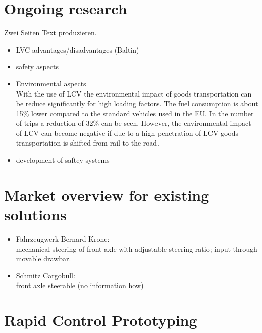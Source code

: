 \documentclass[ExampleMasters.tex]{subfiles}
\begin{document}
\section{Ongoing research}
\label{sec:ongoing_research}
Zwei Seiten Text produzieren. 
\begin{itemize}
	\item LVC advantages/disadvantages (Baltin)
	\item safety aspects
	\item Environmental aspects \\
	With the use of LCV the environmental impact of goods transportation can be reduce significantly for high loading factors. The fuel consumption is about 15\% lower compared to the standard vehicles used in the EU. In the number of trips a reduction of 32\% can be seen. \cite{backman2002improved}
	However, the environmental impact of LCV can become negative if due to a high penetration of LCV goods transportation is shifted from rail to the road. \cite{doll2009long}
	\item development of saftey systems
\end{itemize}

\section{Market overview for existing solutions}
\label{sec:market_overview}
\begin{itemize}
	\item Fahrzeugwerk Bernard Krone: \\
	mechanical steering of front axle with adjustable steering ratio; input through movable drawbar.
	\item Schmitz Cargobull: \\
	front axle steerable (no information how)
	
\end{itemize}
\section{Rapid Control Prototyping}
\label{sec:rapid_proto}
\end{document}
